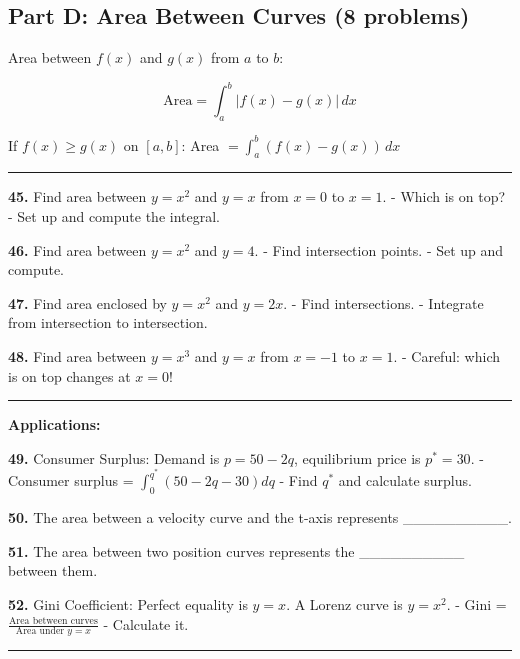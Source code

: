 \documentclass[
  11pt,
]{article}
\begin{document}
\hypertarget{part-d-area-between-curves-8-problems}{%
\subsection{Part D: Area Between Curves (8
problems)}\label{part-d-area-between-curves-8-problems}}

Area between \(f(x)\) and \(g(x)\) from \(a\) to \(b\):

\[\text{Area} = \int_a^b |f(x) - g(x)| \, dx\]

If \(f(x) \geq g(x)\) on \([a,b]\): Area
\(= \int_a^b (f(x) - g(x)) \, dx\)

\begin{center}\rule{0.5\linewidth}{0.5pt}\end{center}

\textbf{45.} Find area between \(y = x^2\) and \(y = x\) from \(x = 0\)
to \(x = 1\). - Which is on top? - Set up and compute the integral.

\textbf{46.} Find area between \(y = x^2\) and \(y = 4\). - Find
intersection points. - Set up and compute.

\textbf{47.} Find area enclosed by \(y = x^2\) and \(y = 2x\). - Find
intersections. - Integrate from intersection to intersection.

\textbf{48.} Find area between \(y = x^3\) and \(y = x\) from \(x = -1\)
to \(x = 1\). - Careful: which is on top changes at \(x = 0\)!

\begin{center}\rule{0.5\linewidth}{0.5pt}\end{center}

\textbf{Applications:}

\textbf{49.} Consumer Surplus: Demand is \(p = 50 - 2q\), equilibrium
price is \(p^* = 30\). - Consumer surplus =
\(\int_0^{q^*} (50 - 2q - 30) dq\) - Find \(q^*\) and calculate surplus.

\textbf{50.} The area between a velocity curve and the t-axis represents
\_\_\_\_\_\_\_\_\_\_.

\textbf{51.} The area between two position curves represents the
\_\_\_\_\_\_\_\_\_\_ between them.

\textbf{52.} Gini Coefficient: Perfect equality is \(y = x\). A Lorenz
curve is \(y = x^2\). - Gini =
\(\frac{\text{Area between curves}}{\text{Area under } y = x}\) -
Calculate it.

\begin{center}\rule{0.5\linewidth}{0.5pt}\end{center}
\end{document}
